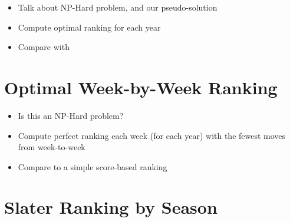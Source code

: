 \documentclass[11pt]{article}
\begin{document}
\begin{itemize}
\item Talk about NP-Hard problem, and our pseudo-solution
\item Compute optimal ranking for each year
\item Compare with \\%
\end{itemize}

\section{Optimal Week-by-Week Ranking}

\begin{itemize}
\item Is this an NP-Hard problem?
\item Compute perfect ranking each week (for each year) with the fewest moves from week-to-week
\item Compare to a simple score-based ranking
\end{itemize}


\newpage



\newpage
\appendix
\thispagestyle{plain}
\onecolumn

\newcommand{\appsection}[1]{\let\oldthesection\thesection
  \renewcommand{\thesection}{Appendix \oldthesection}
  \section{#1}\let\thesection\oldthesection}
  
\appsection{Slater Ranking by Season}\label{app:slater_ranking}
\end{document}
